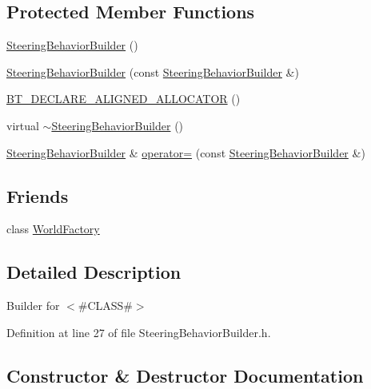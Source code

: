 \subsection*{Protected Member Functions}
\begin{DoxyCompactItemize}
\item 
\mbox{\hyperlink{classnjli_1_1_steering_behavior_builder_a9364e074f4aa52528eb605f243c1c6a3}{Steering\+Behavior\+Builder}} ()
\item 
\mbox{\hyperlink{classnjli_1_1_steering_behavior_builder_a0dae6d4d65b59978330c17f4e8fa7eba}{Steering\+Behavior\+Builder}} (const \mbox{\hyperlink{classnjli_1_1_steering_behavior_builder}{Steering\+Behavior\+Builder}} \&)
\item 
\mbox{\hyperlink{classnjli_1_1_steering_behavior_builder_acbb319618c411452675fc2efeb4f12f3}{B\+T\+\_\+\+D\+E\+C\+L\+A\+R\+E\+\_\+\+A\+L\+I\+G\+N\+E\+D\+\_\+\+A\+L\+L\+O\+C\+A\+T\+OR}} ()
\item 
virtual \mbox{\hyperlink{classnjli_1_1_steering_behavior_builder_a171cbfb6a137723efa40c5485a274d93}{$\sim$\+Steering\+Behavior\+Builder}} ()
\item 
\mbox{\hyperlink{classnjli_1_1_steering_behavior_builder}{Steering\+Behavior\+Builder}} \& \mbox{\hyperlink{classnjli_1_1_steering_behavior_builder_a7b782750f974aeb6cf64b009b6120aa2}{operator=}} (const \mbox{\hyperlink{classnjli_1_1_steering_behavior_builder}{Steering\+Behavior\+Builder}} \&)
\end{DoxyCompactItemize}
\subsection*{Friends}
\begin{DoxyCompactItemize}
\item 
class \mbox{\hyperlink{classnjli_1_1_steering_behavior_builder_acb96ebb09abe8f2a37a915a842babfac}{World\+Factory}}
\end{DoxyCompactItemize}


\subsection{Detailed Description}
Builder for $<$\#\+C\+L\+A\+SS\#$>$ 

Definition at line 27 of file Steering\+Behavior\+Builder.\+h.



\subsection{Constructor \& Destructor Documentation}
\mbox{\label{classnjli_1_1_steering_behavior_builder_a9364e074f4aa52528eb605f243c1c6a3}} 

